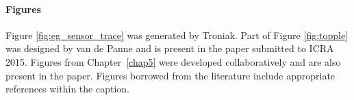 \paragraph{Figures}
Figure \ref{fig:eg_sensor_trace} was generated by Troniak. Part of Figure \ref{fig:topple} was designed by van de Panne and is present in the paper submitted to ICRA 2015. 
Figures from Chapter~\ref{chap5} were developed collaboratively and are also present in the paper. Figures borrowed from the literature include appropriate references within the caption.
